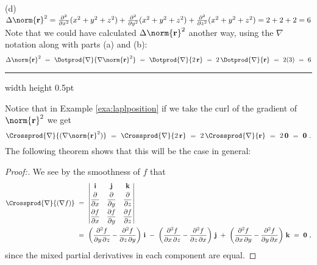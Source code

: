 \begin{exa}
\begin{displaymath}
 \end{displaymath}
 \par\noindent (d) $\Delta \norm{\textbf{r}}^2 = \frac{\partial^2}{\partial x^2}(x^2 + y^2 + z^2 ) +
  \frac{\partial^2}{\partial y^2}(x^2 + y^2 + z^2 ) + \frac{\partial^2}{\partial z^2}(x^2 + y^2 + z^2 ) =
  2+2+2=6$\vspace{2mm}\\
  Note that we could have calculated $\Delta \norm{\textbf{r}}^2$ another way, using the $\nabla$ notation along with
  parts (a) and (b):
  \begin{displaymath}
   \Delta \norm{\textbf{r}}^2 ~=~ \Dotprod{\nabla}{\nabla \norm{\textbf{r}}^2} ~=~ \Dotprod{\nabla}{2\,\textbf{r}} ~=~
   2\,\Dotprod{\nabla}{\textbf{r}} ~=~ 2(3) ~=~ 6
  \end{displaymath}
\end{exa}
\hrule width \textwidth height 0.5pt
\vspace{3mm}

Notice that in Example \ref{exa:laplposition} if we take the curl of the gradient of $\norm{\textbf{r}}^2$ we get
\begin{displaymath}
 \Crossprod{\nabla}{( \nabla \norm{\textbf{r}}^2 )} ~=~ \Crossprod{\nabla}{2\,\textbf{r}} ~=~
 2\,\Crossprod{\nabla}{\textbf{r}} ~=~ 2\,\textbf{0} ~=~ \textbf{0} ~.
\end{displaymath}
The following theorem shows that this will be the case in general:

\begin{proof}[Proof:]
 We see by the smoothness of $f$ that
 \begin{align*}
  \Crossprod{\nabla}{(\nabla f)} ~&=~ \begin{vmatrix}
   \textbf{i} & \textbf{j} & \textbf{k} \vspace{1mm}\\ \dfrac{\partial}{\partial x} & \dfrac{\partial}{\partial y} &
    \dfrac{\partial}{\partial z} \vspace{1mm}\\
   \dfrac{\partial f}{\partial x} & \dfrac{\partial f}{\partial y} & \dfrac{\partial f}{\partial z}
   \end{vmatrix}\\
  &=~ \left( \frac{\partial^2 f}{\partial y\,\partial z}-\frac{\partial^2 f}{\partial z\,\partial y} \right) \,\textbf{i}
   ~-~ \left( \frac{\partial^2 f}{\partial x\,\partial z}-\frac{\partial^2 f}{\partial z\,\partial x} \right) \,\textbf{j}
   ~+~ \left( \frac{\partial^2 f}{\partial x\,\partial y}-\frac{\partial^2 f}{\partial y\,\partial x} \right) \,\textbf{k}
  ~=~ \textbf{0} ~,
 \end{align*}
 since the mixed partial derivatives in each component are equal.\vspace{-3mm}
\end{proof}

